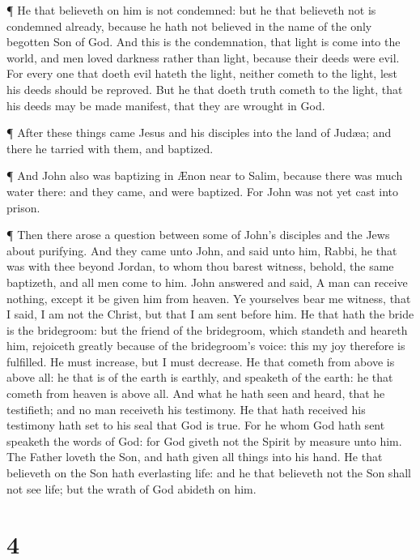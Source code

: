  ¶ He that believeth on him is not condemned: but he that
believeth not is condemned already, because he hath not believed in the
name of the only begotten Son of God.  And this is the
condemnation, that light is come into the world, and men loved darkness
rather than light, because their deeds were evil.  For
every one that doeth evil hateth the light, neither cometh to the light,
lest his deeds should be reproved.  But he that doeth truth
cometh to the light, that his deeds may be made manifest, that they are
wrought in God.

 ¶ After these things came Jesus and his disciples into the
land of Judæa; and there he tarried with them, and baptized.

 ¶ And John also was baptizing in Ænon near to Salim,
because there was much water there: and they came, and were baptized.
 For John was not yet cast into prison.

 ¶ Then there arose a question between some of John's
disciples and the Jews about purifying.  And they came unto
John, and said unto him, Rabbi, he that was with thee beyond Jordan, to
whom thou barest witness, behold, the same baptizeth, and all men come
to him.  John answered and said, A man can receive nothing,
except it be given him from heaven.  Ye yourselves bear me
witness, that I said, I am not the Christ, but that I am sent before
him.  He that hath the bride is the bridegroom: but the
friend of the bridegroom, which standeth and heareth him, rejoiceth
greatly because of the bridegroom's voice: this my joy therefore is
fulfilled.  He must increase, but I must decrease.
 He that cometh from above is above all: he that is of the
earth is earthly, and speaketh of the earth: he that cometh from heaven
is above all.  And what he hath seen and heard, that he
testifieth; and no man receiveth his testimony.  He that
hath received his testimony hath set to his seal that God is true.
 For he whom God hath sent speaketh the words of God: for
God giveth not the Spirit by measure unto him.  The Father
loveth the Son, and hath given all things into his hand. 
He that believeth on the Son hath everlasting life: and he that
believeth not the Son shall not see life; but the wrath of God abideth
on him.

\hypertarget{section-3}{%
\section{4}\label{section-3}}

